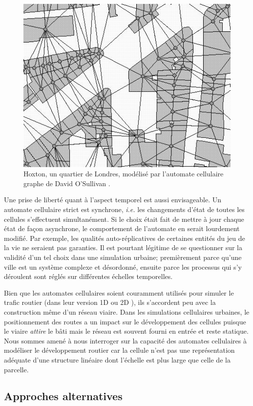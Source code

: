 \documentclass[12pt]{article}
\begin{document}
\begin{figure}[H]
  \centering
  \includegraphics[width=.7\linewidth]{images/gca.png}
  \caption{Hoxton, un quartier de Londres, modélisé par l'automate
    cellulaire graphe de David O'Sullivan \cite{O'Sullivan2000}.}
  \label{fig:sullivan}
\end{figure}

Une prise de liberté quant à l'aspect temporel est aussi
envisageable. Un automate cellulaire strict est synchrone,
\textit{i.e.} les changements d'état de toutes les cellules
s'effectuent simultanément. Si le choix était fait de mettre à jour
chaque état de façon asynchrone, le comportement de l'automate en
serait lourdement modifié. Par exemple, les qualités auto-réplicatives
de certaines entités du jeu de la vie ne seraient pas garanties. Il
est pourtant légitime de se questionner sur la validité d'un tel choix
dans une simulation urbaine; premièrement parce qu'une ville est un
système complexe et désordonné, ensuite parce les processus qui s'y
déroulent sont réglés sur différentes échelles temporelles.

Bien que les automates cellulaires soient couramment utilisés pour
simuler le trafic routier (dans leur version 1D ou 2D
\cite{Queloz1996}), ils s'accordent peu avec la construction même d'un
réseau viaire. Dans les simulations cellulaires urbaines, le
positionnement des routes a un impact sur le développement des
cellules puisque le viaire \textit{attire} le bâti mais le réseau est
souvent fourni en entrée et reste statique. Nous sommes amené à nous
interroger sur la capacité des automates cellulaires à modéliser le
développement routier car la cellule n'est pas une représentation
adéquate d'une structure linéaire dont l'échelle est plus large que
celle de la parcelle.

\subsection{Approches alternatives}
\end{document}
